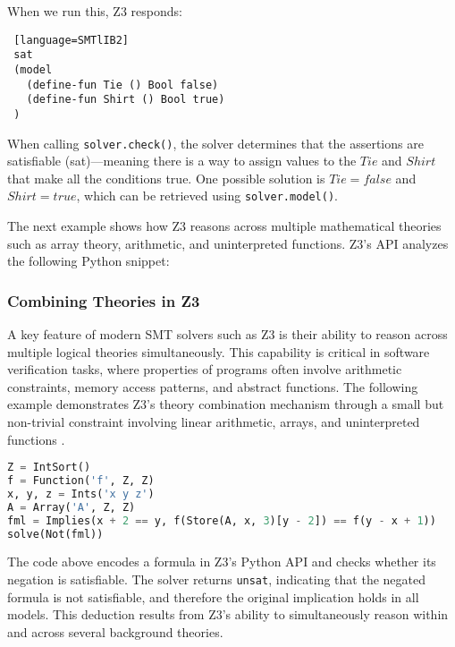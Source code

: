 \documentclass[]{rptuseminar}
\begin{document}
\vspace{1em}

When we run this, Z3 responds:
\begin{lstlisting} [language=SMTlIB2]
 sat
 (model
   (define-fun Tie () Bool false)
   (define-fun Shirt () Bool true)
 )
\end{lstlisting}
\vspace{1em}


When calling \texttt{solver.check()}, the solver determines that the assertions are satisfiable
(sat)—meaning there is a way to assign values to the \(Tie\) and \(Shirt\) that make all the 
conditions true. One possible solution is \(Tie = false\) and \(Shirt = true\), which can be retrieved using \texttt{solver.model()}.
\vspace{1em}



The next example shows how Z3 reasons across multiple mathematical theories such as array theory, arithmetic, and uninterpreted functions. Z3's API analyzes the following Python snippet:


\subsubsection{Combining Theories in Z3}

A key feature of modern SMT solvers such as Z3 is their ability to reason across multiple logical theories simultaneously. 
This capability is critical in software verification tasks, where properties of programs often involve 
arithmetic constraints, memory access patterns, and abstract functions. 
The following example demonstrates Z3’s theory combination mechanism through a small but non-trivial 
constraint involving linear arithmetic, arrays, and uninterpreted functions \cite{nikolaj_bjorner_programming_nodate}.

\begin{lstlisting}[language=Python, label={lst:combined-theories}]
Z = IntSort()
f = Function('f', Z, Z)
x, y, z = Ints('x y z')
A = Array('A', Z, Z)
fml = Implies(x + 2 == y, f(Store(A, x, 3)[y - 2]) == f(y - x + 1))
solve(Not(fml))

\end{lstlisting}
\vspace{1em}

The code above encodes a formula in Z3’s Python API and checks whether its negation is satisfiable. The solver returns \texttt{unsat}, indicating that the negated formula is not satisfiable, and therefore the original implication holds in all models. This deduction results from Z3’s ability to simultaneously reason within and across several background theories.
\end{document}
